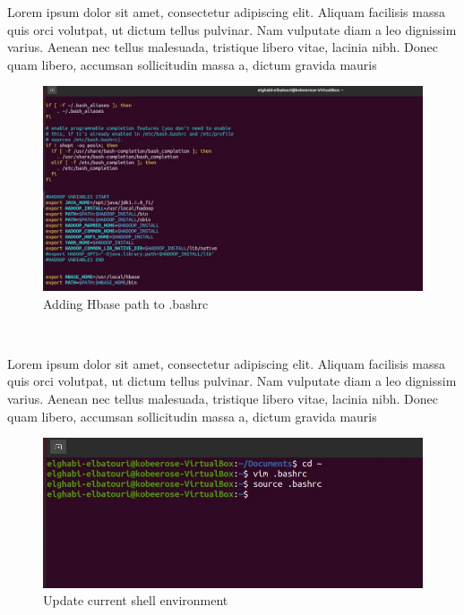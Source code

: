 \begin{spacing}{1.2}
\par Lorem ipsum dolor sit amet, consectetur adipiscing elit. Aliquam facilisis massa quis orci volutpat, ut dictum tellus pulvinar. Nam vulputate diam a leo dignissim varius. Aenean nec tellus malesuada, tristique libero vitae, lacinia nibh. Donec quam libero, accumsan sollicitudin massa a, dictum gravida mauris
\\
\begin{figure}[!htb] 
\begin{center} 
\includegraphics[width=1\linewidth]{Pictures/HBase/Configuring Hbase in Standalone & Pseudo-distributed mode/Installing and Configuring Apache Hbase/Adding Hbase path to .bashrc} 
\end{center} 
\caption{Adding Hbase path to .bashrc} 
\end{figure}  \FloatBarrier
\\

\par Lorem ipsum dolor sit amet, consectetur adipiscing elit. Aliquam facilisis massa quis orci volutpat, ut dictum tellus pulvinar. Nam vulputate diam a leo dignissim varius. Aenean nec tellus malesuada, tristique libero vitae, lacinia nibh. Donec quam libero, accumsan sollicitudin massa a, dictum gravida mauris
\\
\begin{figure}[!htb] 
\begin{center} 
\includegraphics[width=1\linewidth]{Pictures/HBase/Configuring Hbase in Standalone & Pseudo-distributed mode/Installing and Configuring Apache Hbase/Update current shell environment} 
\end{center} 
\caption{Update current shell environment} 
\end{figure}  \FloatBarrier
\\


\end{spacing}
